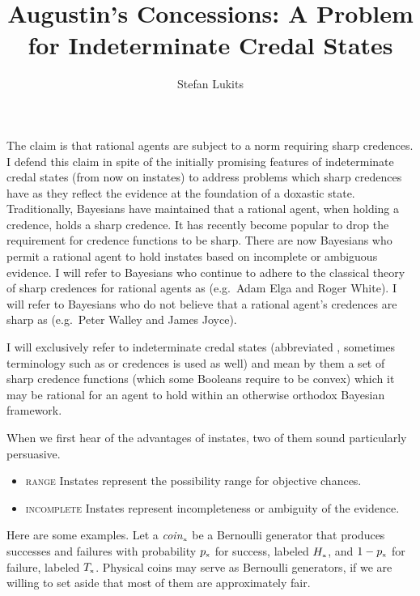 \documentclass[11pt]{article}
\begin{document}

\title{Augustin's Concessions: A Problem for Indeterminate Credal States}
\author{Stefan Lukits}
\date{}
\maketitle

The claim is that rational agents are subject to a norm requiring
sharp credences. I defend this claim in spite of the initially
promising features of indeterminate credal states (from now on
instates) to address problems which sharp credences have as they
reflect the evidence at the foundation of a doxastic state.
Traditionally, Bayesians have maintained that a rational agent, when
holding a credence, holds a sharp credence. It has recently become
popular to drop the requirement for credence functions to be sharp.
There are now Bayesians who permit a rational agent to hold instates
based on incomplete or ambiguous evidence. I will refer to Bayesians
who continue to adhere to the classical theory of sharp credences for
rational agents as  (e.g.\ Adam Elga and Roger
White). I will refer to Bayesians who do not believe that a rational
agent's credences are sharp as  (e.g.\ Peter Walley
and James Joyce).

I will exclusively refer to indeterminate credal states (abbreviated
, sometimes terminology such as  or
 credences is used as well) and mean by them a set of
sharp credence functions (which some Booleans require to be convex)
which it may be rational for an agent to hold within an otherwise
orthodox Bayesian framework.

When we first hear of the advantages of instates, two of them sound
particularly persuasive.

\begin{itemize}
\item \textsc{range} Instates represent the possibility range for
  objective chances.
\item \textsc{incomplete} Instates represent incompleteness or ambiguity
  of the evidence.
\end{itemize}

Here are some examples. Let a \textit{coin}$_{\mbox{\tiny{x}}}$ be a
Bernoulli generator that produces successes and failures with
probability $p_{\mbox{\tiny{x}}}$ for success, labeled
$H_{\mbox{\tiny{x}}}$, and $1-p_{\mbox{\tiny{x}}}$ for failure,
labeled $T_{\mbox{\tiny{x}}}$. Physical coins may serve as Bernoulli
generators, if we are willing to set aside that most of them are
approximately fair.
\end{document}
